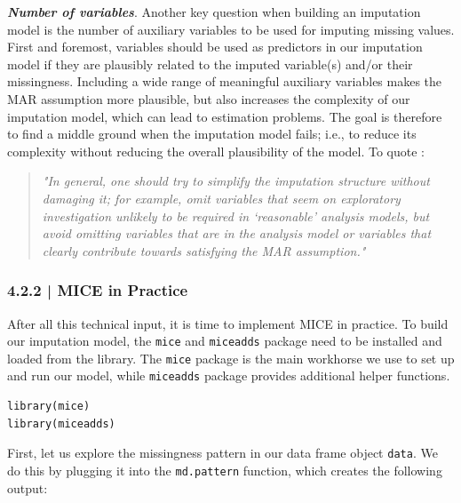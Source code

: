 \begin{box-info-continued} 


\textbf{\emph{Number of variables}}. Another key question when building an imputation model is the number of auxiliary variables to be used for imputing missing values. First and foremost, variables should be used as predictors in our imputation model if they are plausibly related to the imputed variable(s) and/or their missingness. Including a wide range of meaningful auxiliary variables makes the MAR assumption more plausible, but also increases the complexity of our imputation model, which can lead to estimation problems. The goal is therefore to find a middle ground when the imputation model fails; i.e., to reduce its complexity without reducing the overall plausibility of the model. To quote \cite{White2011}:

\begin{quote}
    \emph{"In general, one should try to simplify the imputation structure without
damaging it; for example, omit variables that seem on exploratory
investigation unlikely to be required in ‘reasonable’ analysis models, but
avoid omitting variables that are in the analysis model or variables that
clearly contribute towards satisfying the MAR assumption."}
\end{quote}

\end{box-info-continued}


\subsubsection{{\normalfont\textsf{\textcolor{sBlue}{\small 4.2.2 |}}} \textsf{MICE} in Practice}


After all this technical input, it is time to implement \textsf{MICE} in practice. To build our imputation model, the \texttt{mice} and \texttt{miceadds} \citep{miceadds_3.12-26} package need to be installed and loaded from the library. The \texttt{mice} package is the main workhorse we use to set up and run our model, while \texttt{miceadds} package provides additional helper functions.

\begin{lstlisting}
library(mice)
library(miceadds)
\end{lstlisting}

First, let us explore the missingness pattern in our data frame object \texttt{data}. We do this by plugging it into the \texttt{md.pattern}  function, which creates the following output:

